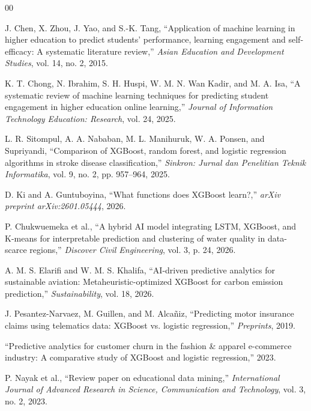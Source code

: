 \documentclass[conference]{IEEEtran}
\begin{document}
\begin{thebibliography}{00}

J. Chen, X. Zhou, J. Yao, and S.-K. Tang, 
``Application of machine learning in higher education to predict students’ performance, learning engagement and self-efficacy: A systematic literature review,'' 
\textit{Asian Education and Development Studies}, vol. 14, no. 2, 2015.

K. T. Chong, N. Ibrahim, S. H. Huspi, W. M. N. Wan Kadir, and M. A. Isa, 
``A systematic review of machine learning techniques for predicting student engagement in higher education online learning,'' 
\textit{Journal of Information Technology Education: Research}, vol. 24, 2025.

L. R. Sitompul, A. A. Nababan, M. L. Manihuruk, W. A. Ponsen, and Supriyandi, 
``Comparison of XGBoost, random forest, and logistic regression algorithms in stroke disease classification,'' 
\textit{Sinkron: Jurnal dan Penelitian Teknik Informatika}, vol. 9, no. 2, pp. 957--964, 2025.

D. Ki and A. Guntuboyina, 
``What functions does XGBoost learn?,'' 
\textit{arXiv preprint arXiv:2601.05444}, 2026.

P. Chukwuemeka et al., 
``A hybrid AI model integrating LSTM, XGBoost, and K-means for interpretable prediction and clustering of water quality in data-scarce regions,'' 
\textit{Discover Civil Engineering}, vol. 3, p. 24, 2026.

A. M. S. Elarifi and W. M. S. Khalifa, 
``AI-driven predictive analytics for sustainable aviation: Metaheuristic-optimized XGBoost for carbon emission prediction,'' 
\textit{Sustainability}, vol. 18, 2026.

J. Pesantez-Narvaez, M. Guillen, and M. Alcañiz, 
``Predicting motor insurance claims using telematics data: XGBoost vs. logistic regression,'' 
\textit{Preprints}, 2019.

``Predictive analytics for customer churn in the fashion \& apparel e-commerce industry: A comparative study of XGBoost and logistic regression,'' 
2023.

P. Nayak et al., 
``Review paper on educational data mining,'' 
\textit{International Journal of Advanced Research in Science, Communication and Technology}, vol. 3, no. 2, 2023.

\end{thebibliography}
\end{document}

